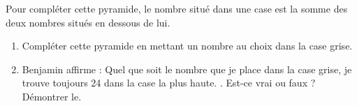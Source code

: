 \documentclass[a4paper,11pt,fleqn]{article}		%
\begin{document}
\begin{minipage}{0.4\linewidth}
	\begin{center}
\end{center}
\end{minipage}
\begin{minipage}{0.6\linewidth}
Pour compléter cette pyramide, le nombre situé dans une case est la somme des deux nombres situés en dessous de lui.

\begin{enumerate}
	\item Compléter cette pyramide en mettant un nombre au choix dans la case grise.
	\item Benjamin affirme : \og{} Quel que soit le nombre que je place dans la case grise, je trouve toujours 24 dans la case la plus haute. \fg{}. Est-ce vrai ou faux ? Démontrer le.
\end{enumerate}
\end{minipage}
\end{document}

